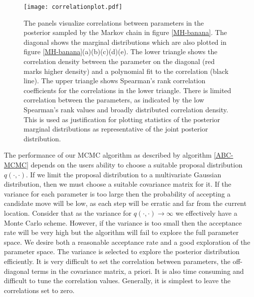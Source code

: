 \begin{figure}[H]
	\centering
	\texttt{[image: correlationplot.pdf]}
	\caption{The panels visualize correlations between parameters in the posterior sampled by the Markov chain in figure \ref{MH-banana}. The diagonal shows the marginal distributions which are also plotted in figure \ref{MH-banana}(a)(b)(c)(d)(e). The lower triangle shows the correlation density between the parameter on the diagonal (red marks higher density) and a polynomial fit to the correlation (black line). The upper triangle shows Spearman's rank correlation coefficients for the correlations in the lower triangle. There is limited correlation between the parameters, as indicated by the low Spearman's rank values and broadly distributed correlation density. This is used as justification for plotting statistics of the posterior marginal distributions as representative of the joint posterior distribution.}
	\label{correlation-plot}
\end{figure}

The performance of our MCMC algorithm as described by algorithm \ref{ABC-MCMC} depends on the users ability to choose a suitable proposal distribution $q(\cdot,\cdot)$. If we limit the proposal distribution to a multivariate Gaussian distribution, then we must choose a suitable covariance matrix for it. If the variance for each parameter is too large then the probability of accepting a candidate move will be low, as each step will be erratic and far from the current location. Consider that as the variance for $q(\cdot,\cdot) \rightarrow \infty$ we effectively have a Monte Carlo scheme. However, if the variance is too small then the acceptance rate will be very high but the algorithm will fail to explore the full parameter space. We desire both a reasonable acceptance rate and a good exploration of the parameter space. The variance is selected to explore the posterior distribution efficiently. It is very difficult to set the correlation between parameters, the off-diagonal terms in the covariance matrix, a priori. It is also time consuming and difficult to tune the correlation values. Generally, it is simplest to leave the correlations set to zero. \par

